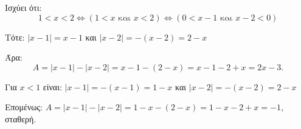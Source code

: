 
\begin{alist}
\item Ισχύει ότι:
\[1 < x < 2 \Leftrightarrow (1 < x \text{ και } x < 2) \Leftrightarrow (0 < x - 1 \text{ και } x - 2 < 0)\]

Τότε:
$|x - 1| = x - 1$ και $|x - 2| = -(x - 2) = 2 - x$

Άρα:
\[A = |x - 1| - |x - 2| = x - 1 - (2 - x) = x - 1 - 2 + x = 2x - 3.\]

\item Για $x < 1$ είναι:
$|x - 1| = -(x - 1) = 1 - x$ και $|x - 2| = -(x - 2) = 2 - x$

Επομένως:
$A = |x - 1| - |x - 2| = 1 - x - (2 - x) = 1 - x - 2 + x = -1$, σταθερή.
\end{alist}

